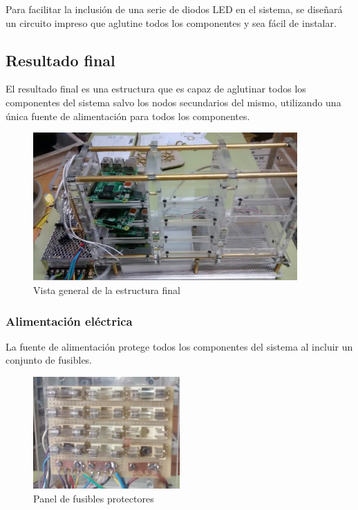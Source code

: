 Para facilitar la inclusión de una serie de diodos LED en el sistema, se diseñará un circuito impreso que aglutine todos los componentes y sea fácil de instalar.

\subsection{Resultado final}

El resultado final es una estructura que es capaz de aglutinar todos los componentes del sistema salvo los nodos secundarios del mismo, utilizando una única fuente de alimentación para todos los componentes.

\begin{figure}[H]
\centering
\includegraphics[width=0.9\textwidth]{Chapters/Chapter5/Figures/estructuraFinal/general}
\caption{Vista general de la estructura final}
\end{figure}

\subsubsection{Alimentación eléctrica}

La fuente de alimentación protege todos los componentes del sistema al incluir un conjunto de fusibles.
\begin{figure}[H]
	\centering
	\includegraphics[width=0.5\textwidth]{Chapters/Chapter5/Figures/fusibles}
	\caption{Panel de fusibles protectores}
\end{figure}

